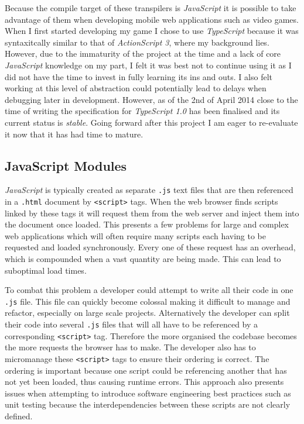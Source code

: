 \documentclass[final]{cmpreport}
\begin{document}
Because the compile target of these transpilers is \textit{JavaScript} it is possible to take advantage of them when developing mobile web applications such as video games. When I first started developing my game I chose to use \textit{TypeScript} because it was syntaxitcally similar to that of \textit{ActionScript 3}, where my background lies. However, due to the immaturity of the project at the time and a lack of core \textit{JavaScript} knowledge on my part, I felt it was best not to continue using it as I did not have the time to invest in fully learning its ins and outs. I also felt working at this level of abstraction could potentially lead to delays when debugging later in development. However, as of the 2nd of April 2014 close to the time of writing the specification for \textit{TypeScript 1.0} has been finalised and its current status is \textit{stable}. Going forward after this project I am eager to re-evaluate it now that it has had time to mature.

\subsection{JavaScript Modules}
\textit{JavaScript} is typically created as separate \texttt{.js} text files that are then referenced in a \texttt{.html} document by \texttt{<script>} tags. When the web browser finds scripts linked by these tags it will request them from the web server and inject them into the document once loaded. This presents a few problems for large and complex web applications which will often require many scripts each having to be requested and loaded synchronously. Every one of these request has an overhead, which is compounded when a vast quantity are being made. This can lead to suboptimal load times.

To combat this problem a developer could attempt to write all their code in one \texttt{.js} file. This file can quickly become colossal making it difficult to manage and refactor, especially on large scale projects. Alternatively the developer can split their code into several \texttt{.js} files that will all have to be referenced by a corresponding \texttt{<script>} tag. Therefore the more organised the codebase becomes the more requests the browser has to make. The developer also has to micromanage these \texttt{<script>} tags to ensure their ordering is correct. The ordering is important because one script could be referencing another that has not yet been loaded, thus causing runtime errors. This approach also presents issues when attempting to introduce software engineering best practices such as unit testing because the interdependencies between these scripts are not clearly defined.
\end{document}
